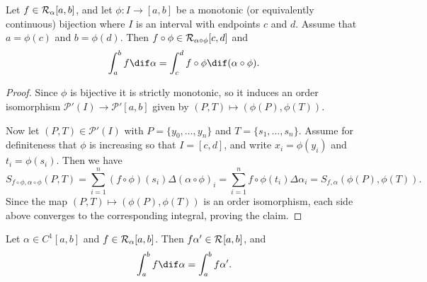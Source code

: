 \documentclass[article, a4paper, 11pt, oneside]{memoir}
\numberwithin{equation}{chapter}
\newcommand{\calP}{\mathcal{P}}
\begin{document}
\begin{proposition}
    Let $f \in \integrable[\alpha]{a,b}$, and let $\phi \colon I \to [a,b]$ be a monotonic (or equivalently continuous) bijection where $I$ is an interval with endpoints $c$ and $d$. Assume that $a = \phi(c)$ and $b = \phi(d)$. Then $f \circ \phi \in \integrable[\alpha \circ \phi]{c,d}$ and
    \begin{equation*}
        \int_a^b f \dif \alpha
            = \int_c^d f \circ \phi \dif(\alpha \circ \phi).
    \end{equation*}
\end{proposition}

\begin{proof}
    Since $\phi$ is bijective it is strictly monotonic, so it induces an order isomorphism $\calP'(I) \to \calP'[a,b]$ given by $(P, T) \mapsto (\phi(P), \phi(T))$.

    Now let $(P,T) \in \calP'(I)$ with $P = \{y_0, \ldots, y_n\}$ and $T = \{s_1, \ldots, s_n\}$. Assume for definiteness that $\phi$ is increasing so that $I = [c,d]$, and write $x_i = \phi(y_i)$ and $t_i = \phi(s_i)$. Then we have
    \begin{equation*}
        S_{f \circ \phi, \alpha \circ \phi}(P,T)
            = \sum_{i=1}^n (f \circ \phi)(s_i) \Delta(\alpha \circ \phi)_i
            = \sum_{i=1}^n f \circ \phi(t_i) \Delta \alpha_i
            = S_{f,\alpha}(\phi(P),\phi(T)).
    \end{equation*}
    Since the map $(P,T) \mapsto (\phi(P),\phi(T))$ is an order isomorphism, each side above converges to the corresponding integral, proving the claim.
\end{proof}


\begin{proposition}
    \label{prop:reduction-to-Riemann-integral}
    Let $\alpha \in C^1[a,b]$ and $f \in \integrable[\alpha]{a,b}$. Then $f \alpha' \in \integrable{a,b}$, and
    \begin{equation*}
        \int_a^b f \dif\alpha
            = \int_a^b f \alpha'.
    \end{equation*}
\end{proposition}
\end{document}
